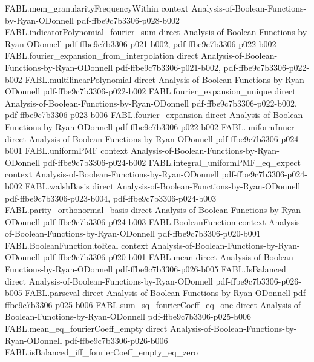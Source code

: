\begin{theorem}
\proofstep
  {FABL.mem_granularityFrequencyWithin}
  {context}
  {Analysis-of-Boolean-Functions-by-Ryan-ODonnell}
  {pdf-ffbe9c7b3306-p028-b002}
\proofstep
  {FABL.indicatorPolynomial_fourier_sum}
  {direct}
  {Analysis-of-Boolean-Functions-by-Ryan-ODonnell}
  {pdf-ffbe9c7b3306-p021-b002,
    pdf-ffbe9c7b3306-p022-b002}
\proofstep
  {FABL.fourier_expansion_from_interpolation}
  {direct}
  {Analysis-of-Boolean-Functions-by-Ryan-ODonnell}
  {pdf-ffbe9c7b3306-p021-b002,
    pdf-ffbe9c7b3306-p022-b002}
\proofstep
  {FABL.multilinearPolynomial}
  {direct}
  {Analysis-of-Boolean-Functions-by-Ryan-ODonnell}
  {pdf-ffbe9c7b3306-p022-b002}
\proofstep
  {FABL.fourier_expansion_unique}
  {direct}
  {Analysis-of-Boolean-Functions-by-Ryan-ODonnell}
  {pdf-ffbe9c7b3306-p022-b002,
    pdf-ffbe9c7b3306-p023-b006}
\proofstep
  {FABL.fourier_expansion}
  {direct}
  {Analysis-of-Boolean-Functions-by-Ryan-ODonnell}
  {pdf-ffbe9c7b3306-p022-b002}
\proofstep
  {FABL.uniformInner}
  {direct}
  {Analysis-of-Boolean-Functions-by-Ryan-ODonnell}
  {pdf-ffbe9c7b3306-p024-b001}
\proofstep
  {FABL.uniformPMF}
  {context}
  {Analysis-of-Boolean-Functions-by-Ryan-ODonnell}
  {pdf-ffbe9c7b3306-p024-b002}
\proofstep
  {FABL.integral_uniformPMF_eq_expect}
  {context}
  {Analysis-of-Boolean-Functions-by-Ryan-ODonnell}
  {pdf-ffbe9c7b3306-p024-b002}
\proofstep
  {FABL.walshBasis}
  {direct}
  {Analysis-of-Boolean-Functions-by-Ryan-ODonnell}
  {pdf-ffbe9c7b3306-p023-b004,
    pdf-ffbe9c7b3306-p024-b003}
\proofstep
  {FABL.parity_orthonormal_basis}
  {direct}
  {Analysis-of-Boolean-Functions-by-Ryan-ODonnell}
  {pdf-ffbe9c7b3306-p024-b003}
\proofstep
  {FABL.BooleanFunction}
  {context}
  {Analysis-of-Boolean-Functions-by-Ryan-ODonnell}
  {pdf-ffbe9c7b3306-p020-b001}
\proofstep
  {FABL.BooleanFunction.toReal}
  {context}
  {Analysis-of-Boolean-Functions-by-Ryan-ODonnell}
  {pdf-ffbe9c7b3306-p020-b001}
\proofstep
  {FABL.mean}
  {direct}
  {Analysis-of-Boolean-Functions-by-Ryan-ODonnell}
  {pdf-ffbe9c7b3306-p026-b005}
\proofstep
  {FABL.IsBalanced}
  {direct}
  {Analysis-of-Boolean-Functions-by-Ryan-ODonnell}
  {pdf-ffbe9c7b3306-p026-b005}
\proofstep
  {FABL.parseval}
  {direct}
  {Analysis-of-Boolean-Functions-by-Ryan-ODonnell}
  {pdf-ffbe9c7b3306-p025-b006}
\proofstep
  {FABL.sum_sq_fourierCoeff_eq_one}
  {direct}
  {Analysis-of-Boolean-Functions-by-Ryan-ODonnell}
  {pdf-ffbe9c7b3306-p025-b006}
\proofstep
  {FABL.mean_eq_fourierCoeff_empty}
  {direct}
  {Analysis-of-Boolean-Functions-by-Ryan-ODonnell}
  {pdf-ffbe9c7b3306-p026-b006}
\proofstep
  {FABL.isBalanced_iff_fourierCoeff_empty_eq_zero}

\end{theorem}
